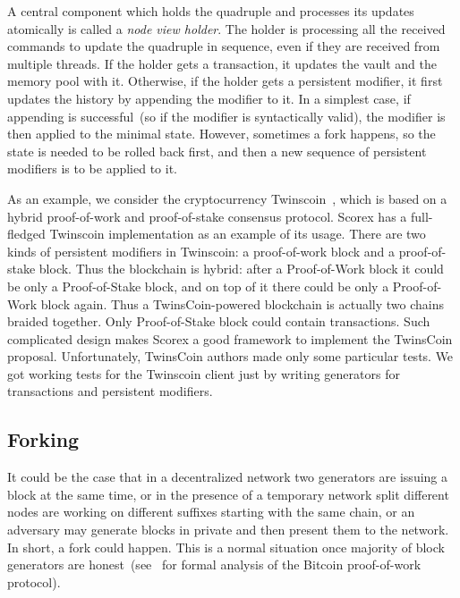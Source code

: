 A central component which holds the quadruple {\em <history, minimal state, vault, memory pool>} and processes its updates atomically is called a {\em node view holder}. The holder is processing all the received commands to update the quadruple in sequence, even if they are received from multiple threads. If the holder gets a transaction, it updates the vault and the memory pool with it. Otherwise, if the holder gets a persistent modifier, it first updates the history by appending the modifier to it. In a simplest case, if appending is successful~(so if the modifier is syntactically valid), the modifier is then applied to the minimal state. However, sometimes a fork happens, so the state is needed to be rolled back first, and then a new sequence of persistent modifiers is to be applied to it. 

As an example, we consider the cryptocurrency Twinscoin~\cite{cryptoeprint:2017:232}, which is based on a hybrid proof-of-work and proof-of-stake consensus protocol. Scorex has a full-fledged Twinscoin implementation as an example of its usage. There are two kinds of persistent modifiers in Twinscoin: a proof-of-work block and a proof-of-stake block. Thus the blockchain is hybrid: after a Proof-of-Work block it could be only a Proof-of-Stake block, and on top of it there could be only a Proof-of-Work block again. Thus a TwinsCoin-powered blockchain is actually two chains braided together. Only Proof-of-Stake block could contain transactions. Such complicated design makes Scorex a good framework to implement the TwinsCoin proposal. Unfortunately, TwinsCoin authors made only some particular tests. We got working tests for the Twinscoin client just by writing generators for transactions and persistent modifiers.

\subsection{Forking}
\label{sec:forking}

It could be the case that in a decentralized network two generators are issuing a block at the same time, or in the presence of a temporary network split different nodes are working on different suffixes starting with the same chain, or an adversary may generate blocks in private and then present them to the network. In short, a fork could happen. This is a normal situation once majority of block generators are honest~(see~\cite{Garay2015} for formal analysis of the Bitcoin proof-of-work protocol).    

